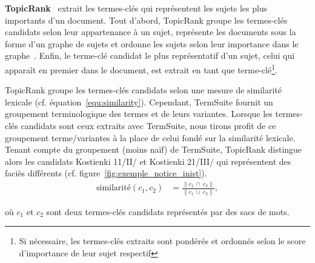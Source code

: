     \textbf{TopicRank}~\cite{bougouin2013topicrank} extrait les termes-clés qui
    représentent les sujets les plus importants d'un document. Tout d'abord,
    TopicRank groupe les termes-clés candidats selon leur appartenance à un
    sujet, représente les documents sous la forme d'un graphe de sujets et
    ordonne les sujets selon leur importance dans le
    graphe~\cite{mihalcea2004textrank}. Enfin, le terme-clé candidat le plus
    représentatif d'un sujet, celui qui apparaît en premier dans le document,
    est extrait en tant que terme-clé\footnote{Si nécessaire, les termes-clés
    extraits sont pondérés et ordonnés selon le score d'importance de leur sujet
    respectif}.
    
    TopicRank groupe les termes-clés candidats selon une mesure de similarité
    lexicale (cf. équation~\ref{equ:similarity}). Cependant, TermSuite fournit
    un groupement terminologique des termes et de leurs variantes. Lorsque les
    termes-clés candidats sont ceux extraits avec TermSuite, nous tirons profit
    de ce groupement terme/variantes à la place de celui fondé sur la similarité
    lexicale. Tenant compte du groupement (moins naïf) de TermSuite, TopicRank
    distingue alors les candidats \og{}Kostienki 11/II/\fg{} et \og{}Kostienki
    21/III/\fg{} qui représentent des faciès différents (cf.
    figure~\ref{fig:exemple_notice_inist}).
    \begin{align}
      \text{similarité}(c_1, c_2) &= \frac{\|c_1~\cap~c_2\|}{\|c_1~\cup~c_2\|}, \label{equ:similarity}
    \end{align}
    \begin{center}
      où $c_1$ et $c_2$ sont deux termes-clés candidats représentés par des sacs
      de mots.
    \end{center}

